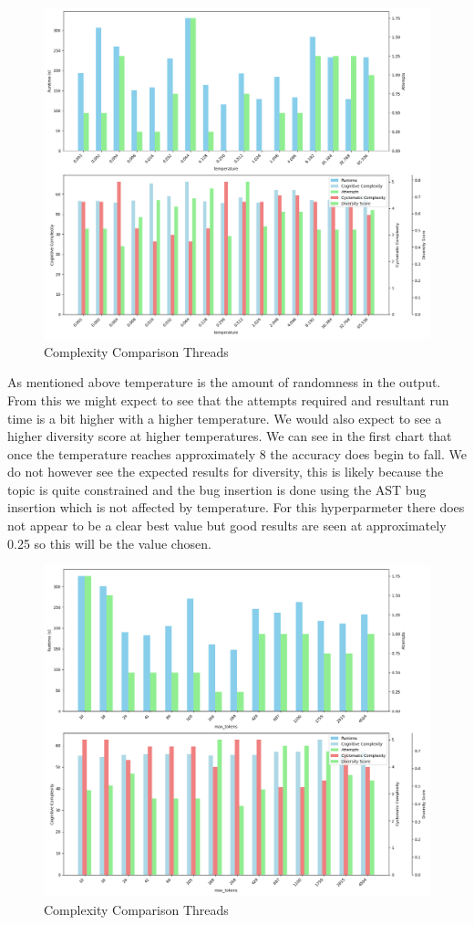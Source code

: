 \documentclass[12pt]{extarticle}
\begin{document}
\begin{figure}[h!]
\centering
\includegraphics[width=0.8\linewidth]{Images/Hyperparam_temperature_Comparison.png}
\caption{Complexity Comparison Threads}
\label{fig:Complexity_Comparison_Threads}
\end{figure}

As mentioned above temperature is the amount of randomness in the output. From this we might expect to see that the attempts required and resultant run time is a bit higher with a higher temperature. We would also expect to see a higher diversity score at higher temperatures. We can see in the first chart that once the temperature reaches approximately 8 the accuracy does begin to fall. We do not however see the expected results for diversity, this is likely because the topic is quite constrained and the bug insertion is done using the AST bug insertion which is not affected by temperature. For this hyperparmeter there does not appear to be a clear best value but good results are seen at approximately 0.25 so this will be the value chosen.

\begin{figure}[h!]
\centering
\includegraphics[width=0.8\linewidth]{Images/Hyperparam_max_tokens_Comparison.png}
\caption{Complexity Comparison Threads}
\label{fig:Complexity_Comparison_Threads}
\end{figure}
\end{document}
